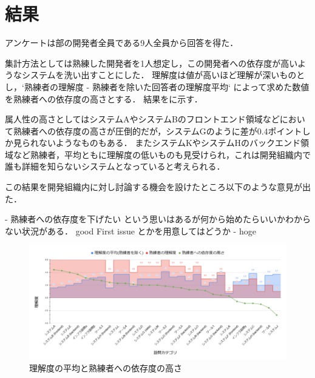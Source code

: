 \section{結果}
アンケートは部の開発者全員である9人全員から回答を得た．

集計方法としては熟練した開発者を1人想定し，この開発者への依存度が高いようなシステムを洗い出すことにした．
理解度は値が高いほど理解が深いものとし，`熟練者の理解度 - 熟練者を除いた回答者の理解度平均` によって求めた数値を熟練者への依存度の高さとする．
結果をに示す．

属人性の高さとしてはシステムAやシステムBのフロントエンド領域などにおいて熟練者への依存度の高さが圧倒的だが，システムGのように差が0.4ポイントしか見られないようなものもある．
またシステムKやシステムHのバックエンド領域など熟練者，平均ともに理解度の低いものも見受けられ，これは開発組織内で誰も詳細を知らないシステムとなっていると考えられる．

この結果を開発組織内に対し討論する機会を設けたところ以下のような意見が出た．

- 熟練者への依存度を下げたい という思いはあるが何から始めたらいいかわからない状況がある． good First issue とかを用意してはどうか
- hoge

\begin{figure}
	\centering
	\includegraphics[keepaspectratio,width=0.9\linewidth]{img/rikai.png}
	\caption{理解度の平均と熟練者への依存度の高さ}
	\label{img:rikai}
\end{figure}
